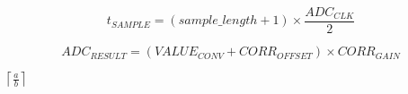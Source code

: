 \documentclass{article}
\begin{document}
\[ t_{SAMPLE} = (sample\_length+1) \times \frac{ADC_{CLK}} {2} \]
\pagebreak

\[ ADC_{RESULT} = (VALUE_{CONV} + CORR_{OFFSET}) \times CORR_{GAIN} \]
\pagebreak

$ \left\lceil \frac{a}{b} \right\rceil $
\pagebreak
\end{document}
